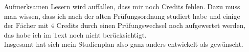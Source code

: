  Aufmerksamen Lesern wird auffallen, dass
 mir noch Credits fehlen. Dazu muss man wissen, dass ich nach der
 alten Prüfungsordnung studiert habe und einige der Fächer mit 4
 Credits durch einen Prüfungswechsel noch aufgewertet werden, das habe
 ich im Text noch nicht berücksichtigt.\\
Insgesamt hat sich mein Studienplan also
 ganz anders entwickelt als gewünscht.
